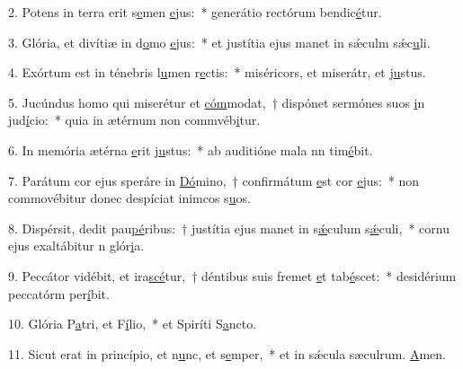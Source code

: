 2. Potens in terra erit s\uline{e}men \uline{e}jus:~* generátio rectórum bendic\uline{é}tur.\par 
3. Glória, et divítiæ in d\uline{o}mo \uline{e}jus:~* et justítia ejus manet in sǽculm sǽc\uline{u}li.\par 
4. Exórtum est in ténebris l\uline{u}men r\uline{e}ctis:~* miséricors, et miserátr, et j\uline{u}stus.\par 
5. Jucúndus homo qui miserétur et \uline{cóm}modat,~† dispónet sermónes suos \uline{i}n jud\uline{í}cio:~* quia in ætérnum non commvéb\uline{i}tur.\par 
6. In memória ætérna \uline{e}rit j\uline{u}stus:~* ab auditióne mala nn tim\uline{é}bit.\par 
7. Parátum cor ejus speráre in \uline{Dó}mino,~† confirmátum \uline{e}st cor \uline{e}jus:~* non commovébitur donec despíciat inimcos s\uline{u}os.\par 
8. Dispérsit, dedit pau\uline{pé}ribus:~† justítia ejus manet in s\uline{ǽ}culum s\uline{ǽ}culi,~* cornu ejus exaltábitur n glór\uline{i}a.\par 
9. Peccátor vidébit, et ira\uline{scé}tur,~† déntibus suis fremet \uline{e}t tab\uline{é}scet:~* desidérium peccatórm per\uline{í}bit.\par 
10. Glória P\uline{a}tri, et F\uline{í}lio,~* et Spiríti S\uline{a}ncto.\par 
11. Sicut erat in princípio, et n\uline{u}nc, et s\uline{e}mper,~* et in sǽcula sæculrum. \uline{A}men.\par 
